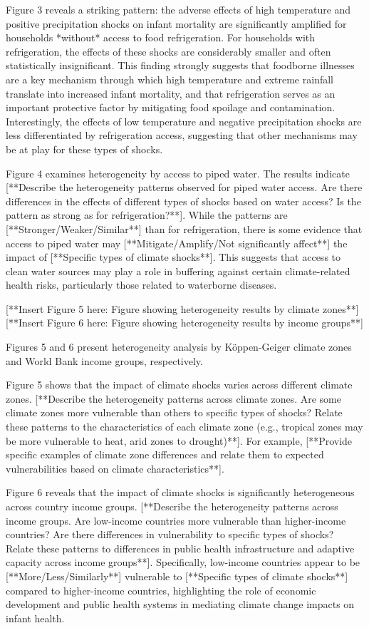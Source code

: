 \documentclass[12pt]{article}
\begin{document}
Figure 3 reveals a striking pattern: the adverse effects of high temperature and positive precipitation shocks on infant mortality are significantly amplified for households *without* access to food refrigeration.  For households with refrigeration, the effects of these shocks are considerably smaller and often statistically insignificant.  This finding strongly suggests that foodborne illnesses are a key mechanism through which high temperature and extreme rainfall translate into increased infant mortality, and that refrigeration serves as an important protective factor by mitigating food spoilage and contamination.  Interestingly, the effects of low temperature and negative precipitation shocks are less differentiated by refrigeration access, suggesting that other mechanisms may be at play for these types of shocks.

Figure 4 examines heterogeneity by access to piped water.  The results indicate [**Describe the heterogeneity patterns observed for piped water access. Are there differences in the effects of different types of shocks based on water access? Is the pattern as strong as for refrigeration?**].  While the patterns are [**Stronger/Weaker/Similar**] than for refrigeration, there is some evidence that access to piped water may [**Mitigate/Amplify/Not significantly affect**] the impact of [**Specific types of climate shocks**]. This suggests that access to clean water sources may play a role in buffering against certain climate-related health risks, particularly those related to waterborne diseases.

[**Insert Figure 5 here: Figure showing heterogeneity results by climate zones**]
[**Insert Figure 6 here: Figure showing heterogeneity results by income groups**]

Figures 5 and 6 present heterogeneity analysis by Köppen-Geiger climate zones and World Bank income groups, respectively.

Figure 5 shows that the impact of climate shocks varies across different climate zones. [**Describe the heterogeneity patterns across climate zones. Are some climate zones more vulnerable than others to specific types of shocks?  Relate these patterns to the characteristics of each climate zone (e.g., tropical zones may be more vulnerable to heat, arid zones to drought)**].  For example, [**Provide specific examples of climate zone differences and relate them to expected vulnerabilities based on climate characteristics**].

Figure 6 reveals that the impact of climate shocks is significantly heterogeneous across country income groups.  [**Describe the heterogeneity patterns across income groups. Are low-income countries more vulnerable than higher-income countries? Are there differences in vulnerability to specific types of shocks? Relate these patterns to differences in public health infrastructure and adaptive capacity across income groups**].  Specifically, low-income countries appear to be [**More/Less/Similarly**] vulnerable to [**Specific types of climate shocks**] compared to higher-income countries, highlighting the role of economic development and public health systems in mediating climate change impacts on infant health.
\end{document}
